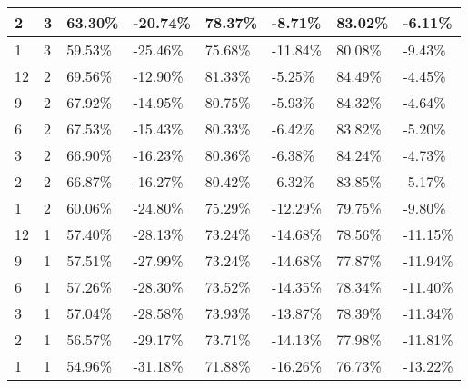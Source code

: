 \begin{table}[!htb]
{\begin{tabular}{|l|l|l|l|l|l|l|l|}
        2 & 3 & 63.30\% & -20.74\% & 78.37\% & -8.71\% & 83.02\% & -6.11\% \\ \hline
        1 & 3 & 59.53\% & -25.46\% & 75.68\% & -11.84\% & 80.08\% & -9.43\% \\ \hline
        \midrule
        12 & 2 & 69.56\% & -12.90\% & 81.33\% & -5.25\% & 84.49\% & -4.45\% \\ \hline
        9 & 2 & 67.92\% & -14.95\% & 80.75\% & -5.93\% & 84.32\% & -4.64\% \\ \hline
        6 & 2 & 67.53\% & -15.43\% & 80.33\% & -6.42\% & 83.82\% & -5.20\% \\ \hline
        3 & 2 & 66.90\% & -16.23\% & 80.36\% & -6.38\% & 84.24\% & -4.73\% \\ \hline
        2 & 2 & 66.87\% & -16.27\% & 80.42\% & -6.32\% & 83.85\% & -5.17\% \\ \hline
        1 & 2 & 60.06\% & -24.80\% & 75.29\% & -12.29\% & 79.75\% & -9.80\% \\ \hline
        \midrule
        12 & 1 & 57.40\% & -28.13\% & 73.24\% & -14.68\% & 78.56\% & -11.15\% \\ \hline
        9 & 1 & 57.51\% & -27.99\% & 73.24\% & -14.68\% & 77.87\% & -11.94\% \\ \hline
        6 & 1 & 57.26\% & -28.30\% & 73.52\% & -14.35\% & 78.34\% & -11.40\% \\ \hline
        3 & 1 & 57.04\% & -28.58\% & 73.93\% & -13.87\% & 78.39\% & -11.34\% \\ \hline
        2 & 1 & 56.57\% & -29.17\% & 73.71\% & -14.13\% & 77.98\% & -11.81\% \\ \hline
        1 & 1 & 54.96\% & -31.18\% & 71.88\% & -16.26\% & 76.73\% & -13.22\% \\ \hline
    \end{tabular}}
    \label{tab:asym-nq}
\end{table}
